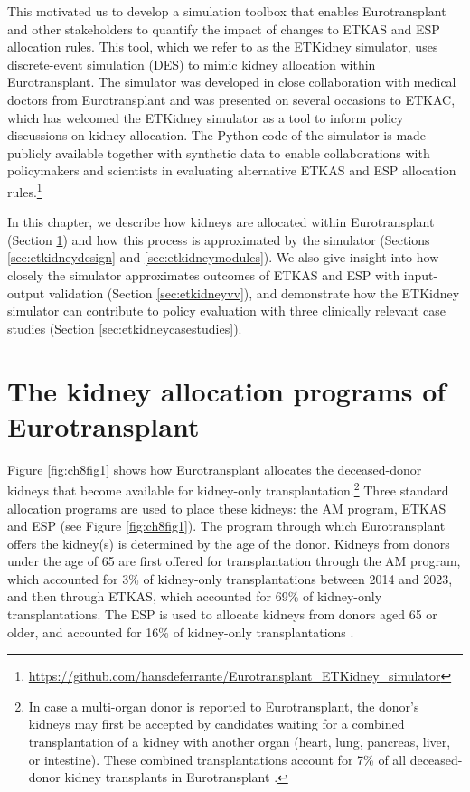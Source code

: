 \documentclass[11pt,twoside,]{book}
\let\rmarkdownfootnote\footnote%
\def\footnote{\protect\rmarkdownfootnote}
\begin{document}
This motivated us to develop a simulation toolbox that enables
Eurotransplant and other stakeholders to quantify the impact of changes
to ETKAS and ESP allocation rules. This tool, which we refer to as the
ETKidney simulator, uses discrete-event simulation (DES) to mimic kidney
allocation within Eurotransplant. The simulator was developed in close
collaboration with medical doctors from Eurotransplant and was presented
on several occasions to ETKAC, which has welcomed the ETKidney simulator as a tool to
inform policy discussions on kidney allocation. The Python code of the
simulator is made publicly available together with synthetic data to
enable collaborations with policymakers and scientists in evaluating
alternative ETKAS and ESP allocation rules.\footnote{\url{https://github.com/hansdeferrante/Eurotransplant_ETKidney_simulator}}

\newpage

In this chapter, we
describe how kidneys are allocated within Eurotransplant (Section \ref{sec:etkidneyalloc}) and how this process is approximated by
the simulator (Sections \ref{sec:etkidneydesign} and \ref{sec:etkidneymodules}). We also give insight into how closely
the simulator approximates outcomes of ETKAS and ESP with input-output
validation (Section \ref{sec:etkidneyvv}), and demonstrate how the ETKidney
simulator can contribute to policy evaluation with three clinically relevant
case studies (Section \ref{sec:etkidneycasestudies}).

\section{The kidney allocation programs of Eurotransplant}\label{sec:etkidneyalloc}

Figure \ref{fig:ch8fig1} shows how Eurotransplant
allocates the deceased-donor kidneys that become available for
kidney-only transplantation.\footnote{In case a multi-organ donor is reported to Eurotransplant,
  the donor's kidneys may first be accepted by candidates waiting for a combined
  transplantation of a kidney with another organ (heart, lung, pancreas, liver, or intestine).
  These combined transplantations account for 7\% of all deceased-donor kidney transplants
  in Eurotransplant \citep{statlibrary2152P_AllET_Kidney}.} Three standard allocation programs are
used to place these kidneys: the AM program, ETKAS and ESP (see Figure \ref{fig:ch8fig1}).
The program through which Eurotransplant offers the kidney(s) is determined by
the age of the donor. Kidneys from donors under the age of 65 are first offered for
transplantation through the AM program, which accounted for 3\% of
kidney-only transplantations between 2014 and 2023, and then through
ETKAS, which accounted for 69\% of kidney-only transplantations. The ESP is
used to allocate kidneys from donors aged 65 or older, and accounted for
16\% of kidney-only transplantations \citep{etStatsLibrary2072P}.
\end{document}
